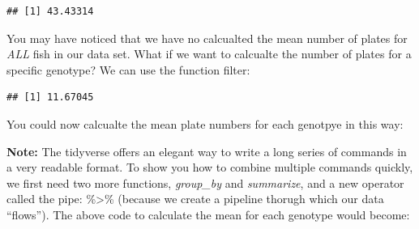 \documentclass[]{article}
\newenvironment{Shaded}{\begin{snugshade}}{\end{snugshade}}
\newcommand{\DataTypeTok}[1]{\textcolor[rgb]{0.13,0.29,0.53}{#1}}
\newcommand{\KeywordTok}[1]{\textcolor[rgb]{0.13,0.29,0.53}{\textbf{#1}}}
\newcommand{\NormalTok}[1]{#1}
\newcommand{\OperatorTok}[1]{\textcolor[rgb]{0.81,0.36,0.00}{\textbf{#1}}}
\newcommand{\StringTok}[1]{\textcolor[rgb]{0.31,0.60,0.02}{#1}}
\begin{document}
\begin{verbatim}
## [1] 43.43314
\end{verbatim}

You may have noticed that we have no calcualted the mean number of
plates for \emph{ALL} fish in our data set. What if we want to calcualte
the number of plates for a specific genotype? We can use the function
filter:

\begin{Shaded}
\end{Shaded}

\begin{verbatim}
## [1] 11.67045
\end{verbatim}

You could now calcualte the mean plate numbers for each genotpye in this
way:

\begin{Shaded}
\end{Shaded}

\textbf{Note:} The tidyverse offers an elegant way to write a long
series of commands in a very readable format. To show you how to combine
multiple commands quickly, we first need two more functions,
\emph{group\_by} and \emph{summarize}, and a new operator called the
pipe: \%\textgreater{}\% (because we create a pipeline thorugh which our
data ``flows''). The above code to calculate the mean for each genotype
would become:

\begin{Shaded}
\end{Shaded}
\end{document}
